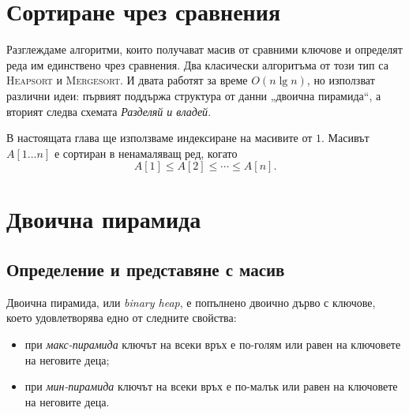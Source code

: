 \begin{konspekt}
\end{konspekt}

\section{Сортиране чрез сравнения}\label{s:6.1}

Разглеждаме алгоритми, които получават масив от сравними ключове и определят реда им единствено чрез сравнения. Два класически алгоритъма от този тип са \textsc{Heapsort} и \textsc{Mergesort}. И двата работят за време $O(n\lg n)$, но използват различни идеи: първият поддържа структура от данни „двоична пирамида“, а вторият следва схемата \emph{Разделяй и владей}.

В настоящата глава ще използваме индексиране на масивите от $1$. Масивът $A[1\ldots n]$ е сортиран в ненамаляващ ред, когато
\[
A[1]\leq A[2]\leq \cdots \leq A[n].
\]

\section{Двоична пирамида}\label{s:6.2}

\subsection{Определение и представяне с масив}\label{s:6.2.1}

\begin{defn}
Двоична пирамида, или \emph{binary heap}, е попълнено двоично дърво с ключове, което удовлетворява едно от следните свойства:
\begin{itemize}
    \item при \emph{макс-пирамида} ключът на всеки връх е по-голям или равен на ключовете на неговите деца;
    \item при \emph{мин-пирамида} ключът на всеки връх е по-малък или равен на ключовете на неговите деца.
\end{itemize}
\end{defn}

